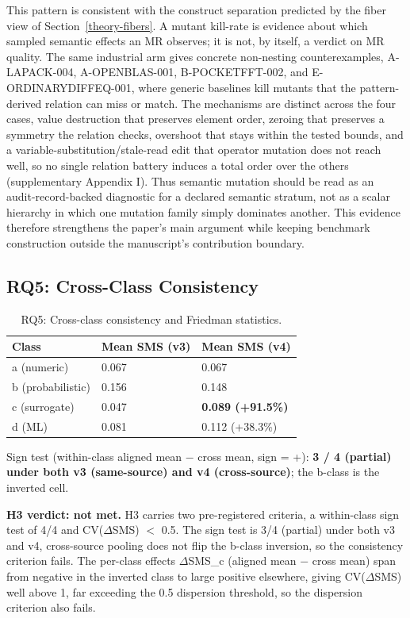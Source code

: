 \documentclass[manuscript,screen,review]{acmart}
\begin{document}
This pattern is consistent with the construct separation predicted by the
fiber view of Section~\ref{theory-fibers}. A mutant kill-rate is evidence about which sampled
semantic effects an MR observes; it is not, by itself, a verdict on MR
quality. The same industrial arm gives concrete non-nesting
counterexamples, A-LAPACK-004, A-OPENBLAS-001, B-POCKETFFT-002, and
E-ORDINARYDIFFEQ-001, where generic baselines kill mutants that the
pattern-derived relation can miss or match. The mechanisms are
distinct across the four cases, value destruction that preserves
element order, zeroing that preserves a symmetry the relation checks,
overshoot that stays within the tested bounds, and a
variable-substitution/stale-read edit that operator mutation does not
reach well, so no single relation battery induces a total order over
the others (supplementary Appendix I).
Thus semantic mutation should be read as an audit-record-backed diagnostic
for a declared semantic stratum, not as a scalar hierarchy in which one
mutation family simply dominates another. This evidence therefore
strengthens the paper's main argument while keeping benchmark construction
outside the manuscript's contribution boundary.

\subsection{RQ5: Cross-Class Consistency}\label{rq3-cross-class-consistency-and-friedman}

{%
\begin{longtable}[]{@{}lll@{}}
\caption{RQ5: Cross-class consistency and Friedman statistics.}\label{tab:p2-12}\\
\toprule\noalign{}
Class & Mean SMS (v3) & Mean SMS (v4) \\
\midrule\noalign{}
\endfirsthead
\endhead
\bottomrule\noalign{}
\endlastfoot
a (numeric) & 0.067 & 0.067 \\
b (probabilistic) & 0.156 & 0.148 \\
c (surrogate) & 0.047 & \textbf{0.089 (+91.5\%)} \\
d (ML) & 0.081 & 0.112 (+38.3\%) \\
\end{longtable}
}

Sign test (within-class aligned mean $-$ cross mean, sign = +): \textbf{3
/ 4 (partial) under both v3 (same-source) and v4 (cross-source)}; the
b-class is the inverted cell.

\textbf{H3 verdict: not met.} H3 carries two pre-registered criteria, a
within-class sign test of 4/4 and CV($\Delta$SMS) $<$ 0.5. The sign test
is 3/4 (partial) under both v3 and v4, cross-source pooling does not
flip the b-class inversion, so the consistency criterion fails. The
per-class effects $\Delta$SMS\_c (aligned mean $-$ cross mean) span from
negative in the inverted class to large positive elsewhere, giving
CV($\Delta$SMS) well above 1, far exceeding the 0.5 dispersion threshold,
so the dispersion criterion also fails.
\end{document}
